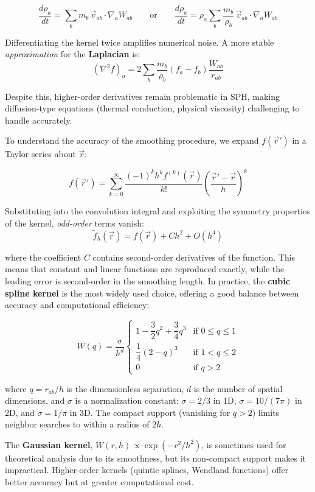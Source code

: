 $$
\frac{d\rho_a}{dt} = \sum_b m_b \, \vec{v}_{ab} \cdot \nabla_a W_{ab}
\qquad \text{or} \qquad
\frac{d\rho_a}{dt} = \rho_a \sum_b \frac{m_b}{\rho_b} \, \vec{v}_{ab} \cdot \nabla_a W_{ab}
$$

Differentiating the kernel twice amplifies numerical noise. A more stable \textit{approximation} for the \textbf{Laplacian} is:
$$
(\nabla^2 f)_a = 2 \sum_b \frac{m_b}{\rho_b} (f_a - f_b) \frac{W_{ab}}{r_{ab}}
$$

Despite this, higher-order derivatives remain problematic in SPH, making diffusion-type equations (thermal conduction, physical viscosity) challenging to handle accurately.

To understand the accuracy of the smoothing procedure, we expand $f(\vec{r}')$ in a Taylor series about $\vec{r}$:

$$
f(\vec{r}') = \sum_{k=0}^\infty \dfrac{(-1)^k h^k f^{(k)}(\vec{r})}{k!} \left(\dfrac{\vec{r}' - \vec{r}}{h}\right)^k
$$

Substituting into the convolution integral and exploiting the symmetry properties of the kernel, \textit{odd-order} terms vanish:
$$
\tilde{f}_h(\vec{r}) = f(\vec{r}) + C h^2 + O(h^4)
$$

where the coefficient $C$ contains second-order derivatives of the function. This means that constant and linear functions are reproduced exactly, while the leading error is second-order in the smoothing length.
In practice, the \textbf{cubic spline kernel} is the most widely used choice, offering a good balance between accuracy and computational efficiency:

\small
$$
W(q) = \dfrac{\sigma}{h^d}
\begin{cases}
    1 - \dfrac{3}{2} q^2 + \dfrac{3}{4} q^3 & \text{if } 0 \leq q \leq 1 \\[0.3em]
    \dfrac{1}{4} (2 - q)^3 & \text{if } 1 < q \leq 2 \\[0.3em]
    0 & \text{if } q > 2
\end{cases}
$$
\normalsize

where $q = r_{ab}/h$ is the dimensionless separation, $d$ is the number of spatial dimensions, and $\sigma$ is a normalization constant: $\sigma = 2/3$ in 1D, $\sigma = 10/(7\pi)$ in 2D, and $\sigma = 1/\pi$ in 3D. The compact support (vanishing for $q > 2$) limits neighbor searches to within a radius of $2h$.

The \textbf{Gaussian kernel}, $W(r,h) \propto \exp(-r^2/h^2)$, is sometimes used for theoretical analysis due to its smoothness, but its non-compact support makes it impractical. Higher-order kernels (quintic splines, Wendland functions) offer better accuracy but at greater computational cost.

